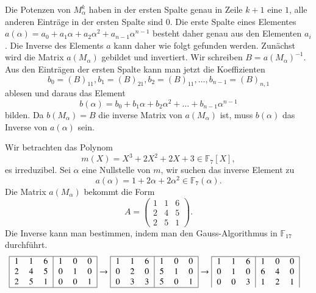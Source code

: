 Die Potenzen von $M_\alpha^k$ haben in der ersten Spalte genau in
Zeile $k+1$ eine $1$, alle anderen Einträge in der ersten Spalte
sind $0$.
Die erste Spalte eines Elementes
$a(\alpha)=a_0+a_1\alpha+a_2\alpha^2 +a_{n-1}\alpha^{n-1}$
besteht daher genau aus den Elementen $a_i$.
Die Inverse des Elements $a$ kann daher wie folgt gefunden werden.
Zunächst wird die Matrix $a(M_\alpha)$ gebildet und invertiert.
Wir schreiben $B=a(M_\alpha)^{-1}$.
Aus den Einträgen der ersten Spalte kann man jetzt die Koeffizienten
\[
b_0=(B)_{11},
b_1=(B)_{21},
b_2=(B)_{11},\dots,
b_{n-1}=(B)_{n,1}
\]
ablesen und daraus das Element
\[
b(\alpha) = b_0+b_1\alpha+b_2\alpha^2 + \dots + b_{n-1}\alpha^{n-1}
\]
bilden.
Da $b(M_\alpha)=B$ die inverse Matrix von $a(M_\alpha)$ ist, muss $b(\alpha)$
das Inverse von $a(\alpha)$ sein.

\begin{beispiel}
Wir betrachten das Polynom 
\[
m(X) = X^3 + 2X^2 + 2X + 3 \in \mathbb{F}_{7}[X],
\]
es irreduzibel.
Sei $\alpha$ eine Nullstelle von $m$, wir suchen das inverse Element zu
\[
a(\alpha)=1+2\alpha+2\alpha^2\in\mathbb{F}_{7}(\alpha).
\]
Die Matrix $a(M_\alpha)$ bekommt die Form
\[
A=\begin{pmatrix}
 1& 1& 6\\
 2& 4& 5\\
 2& 5& 1
\end{pmatrix}.
\]
Die Inverse kann man bestimmen, indem man den
Gauss-Algorithmus in $\mathbb{F}_{17}$ durchführt.
\begin{align*}
\begin{tabular}{|>{$}c<{$}>{$}c<{$}>{$}c<{$}|>{$}c<{$}>{$}c<{$}>{$}c<{$}|}
\hline
 1& 1& 6& 1& 0& 0\\
 2& 4& 5& 0& 1& 0\\
 2& 5& 1& 0& 0& 1\\
\hline
\end{tabular}
&\rightarrow
\begin{tabular}{|>{$}c<{$}>{$}c<{$}>{$}c<{$}|>{$}c<{$}>{$}c<{$}>{$}c<{$}|}
\hline
 1& 1& 6& 1& 0& 0\\
 0& 2& 0& 5& 1& 0\\
 0& 3& 3& 5& 0& 1\\
\hline
\end{tabular}
\rightarrow
\begin{tabular}{|>{$}c<{$}>{$}c<{$}>{$}c<{$}|>{$}c<{$}>{$}c<{$}>{$}c<{$}|}
\hline
 1& 1& 6& 1& 0& 0\\
 0& 1& 0& 6& 4& 0\\
 0& 0& 3& 1& 2& 1\\

\end{tabular}
\end{align*}
\end{beispiel}
